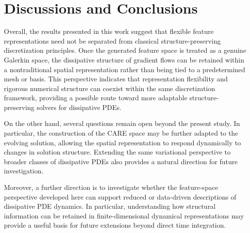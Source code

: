\documentclass[10pt,reqno]{amsart}
\theoremstyle{remark}
\theoremstyle{definition}
\begin{document}
\section{Discussions and Conclusions}
Overall, the results presented in this work suggest that flexible feature representations need not be separated from classical structure-preserving discretization principles. Once the generated feature space is treated as a genuine Galerkin space, the dissipative structure of gradient flows can be retained within a nontraditional spatial representation rather than being tied to a predetermined mesh or basis. This perspective indicates that representation flexibility and rigorous numerical structure can coexist within the same discretization framework, providing a possible route toward more adaptable structure-preserving solvers for dissipative PDEs.

On the other hand, several questions remain open beyond the present study. In particular, the construction of the CARE space may be further adapted to the evolving solution, allowing the spatial representation to respond dynamically to changes in solution structure. Extending the same variational perspective to broader classes of dissipative PDEs also provides a natural direction for future investigation.

Moreover, a further direction is to investigate whether the feature-space perspective developed here can support reduced or data-driven descriptions of dissipative PDE dynamics. In particular, understanding how structural information can be retained in finite-dimensional dynamical representations may provide a useful basis for future extensions beyond direct time integration.

\appendix
\end{document}
